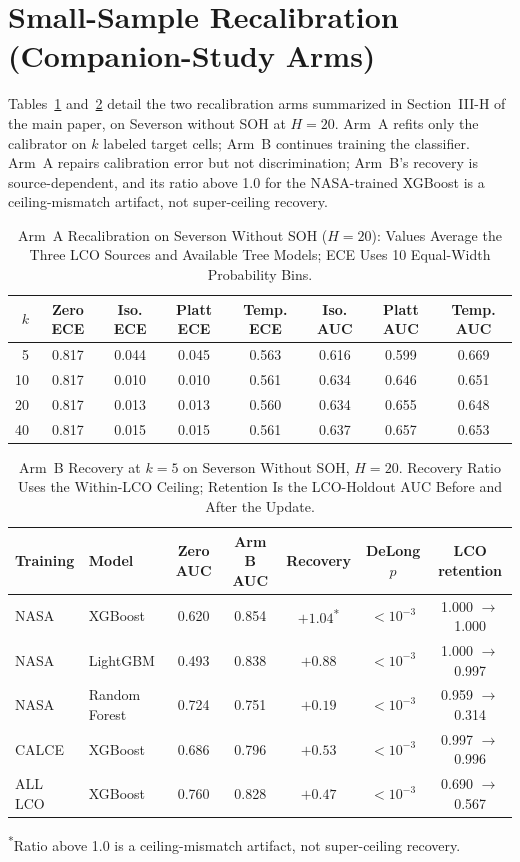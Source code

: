 \documentclass[journal]{IEEEtran}
\begin{document}
\section{Small-Sample Recalibration (Companion-Study Arms)}
Tables~\ref{tab:s_recA} and~\ref{tab:s_recB} detail the two recalibration arms summarized in Section~III-H of the main paper, on Severson without SOH at $H{=}20$. Arm~A refits only the calibrator on $k$ labeled target cells; Arm~B continues training the classifier. Arm~A repairs calibration error but not discrimination; Arm~B's recovery is source-dependent, and its ratio above 1.0 for the NASA-trained XGBoost is a ceiling-mismatch artifact, not super-ceiling recovery.
\begin{table}[!t]
\caption{Arm~A Recalibration on Severson Without SOH ($H{=}20$): Values Average the Three LCO Sources and Available Tree Models; ECE Uses 10 Equal-Width Probability Bins.}
\label{tab:s_recA}
\centering\footnotesize\setlength{\tabcolsep}{4pt}
\begin{tabular}{rccccccc}
\toprule
$k$ & \textbf{Zero ECE} & \textbf{Iso. ECE} & \textbf{Platt ECE} & \textbf{Temp. ECE} & \textbf{Iso. AUC} & \textbf{Platt AUC} & \textbf{Temp. AUC}\\
\midrule
5 & 0.817 & 0.044 & 0.045 & 0.563 & 0.616 & 0.599 & 0.669\\
10 & 0.817 & 0.010 & 0.010 & 0.561 & 0.634 & 0.646 & 0.651\\
20 & 0.817 & 0.013 & 0.013 & 0.560 & 0.634 & 0.655 & 0.648\\
40 & 0.817 & 0.015 & 0.015 & 0.561 & 0.637 & 0.657 & 0.653\\
\bottomrule
\end{tabular}
\end{table}

\begin{table}[!t]
\caption{Arm~B Recovery at $k{=}5$ on Severson Without SOH, $H{=}20$. Recovery Ratio Uses the Within-LCO Ceiling; Retention Is the LCO-Holdout AUC Before and After the Update.}
\label{tab:s_recB}
\centering\footnotesize\setlength{\tabcolsep}{3pt}
\begin{tabular}{llccccc}
\toprule
\textbf{Training} & \textbf{Model} & \textbf{Zero AUC} & \textbf{Arm B AUC} & \textbf{Recovery} & \textbf{DeLong $p$} & \textbf{LCO retention}\\
\midrule
NASA & XGBoost & 0.620 & 0.854 & $+1.04$\textsuperscript{*} & $<10^{-3}$ & 1.000 $\rightarrow$ 1.000\\
NASA & LightGBM & 0.493 & 0.838 & $+0.88$ & $<10^{-3}$ & 1.000 $\rightarrow$ 0.997\\
NASA & Random Forest & 0.724 & 0.751 & $+0.19$ & $<10^{-3}$ & 0.959 $\rightarrow$ 0.314\\
CALCE & XGBoost & 0.686 & 0.796 & $+0.53$ & $<10^{-3}$ & 0.997 $\rightarrow$ 0.996\\
ALL LCO & XGBoost & 0.760 & 0.828 & $+0.47$ & $<10^{-3}$ & 0.690 $\rightarrow$ 0.567\\
\bottomrule
\end{tabular}
\footnotesize\textsuperscript{*}Ratio above 1.0 is a ceiling-mismatch artifact, not super-ceiling recovery.
\end{table}
\end{document}

